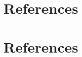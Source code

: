 \documentclass[preprint,12pt]{elsarticle}
\begin{document}
\section*{References}

\section*{References}



 



%
%
%
\end{document}
